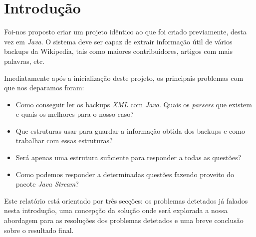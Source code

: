 \documentclass[a4paper,12pt]{report}
\begin{document}

\renewcommand*{\lstlistlistingname}{Lista de Funções}




\maketitle
\tableofcontents


\chapter{Introdução}

Foi-nos proposto criar um projeto idêntico ao que foi criado previamente, desta vez em {\sl Java}. O sistema deve ser capaz de extrair informação útil de vários backups da Wikipedia, tais como maiores contribuidores, artigos com mais palavras, etc.

Imediatamente após a inicialização deste projeto, os principais problemas com que nos deparamos foram:
\begin{itemize}
	\setlength\itemsep{0.00001em}
	\item Como conseguir ler os backups {\sl XML} com {\sl Java}. Quais os {\sl parsers} que existem e quais os melhores para o nosso caso?
	\item Que estruturas usar para guardar a informação obtida dos backups e como trabalhar com essas estruturas?
	\item Será apenas uma estrutura suficiente para responder a todas as questões?
	\item Como podemos responder a determinadas questões fazendo proveito do pacote {\sl Java Stream}?
\end{itemize}

Este relatório está orientado por três secções: os problemas detetados já falados nesta introdução, uma concepção da solução onde será explorada a nossa abordagem para as resoluções dos problemas detetados e uma breve conclusão sobre o resultado final.
\end{document}
